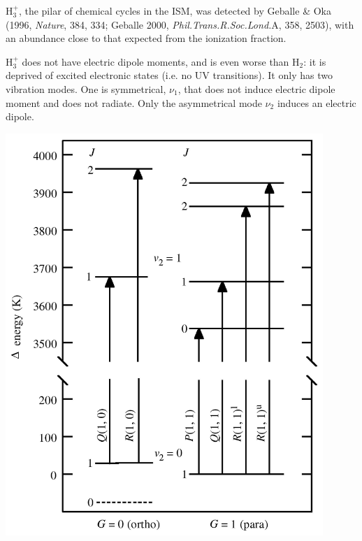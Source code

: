 
\begin{minipage}[t]{13cm}
H$_3^+$, the pilar of chemical cycles in the ISM, was detected by
Geballe \& Oka (1996, {\em Nature}, 384, 334; Geballe 2000, {\em
Phil.Trans.R.Soc.Lond.}A, 358, 2503), with an abundance close to that
expected from the ionization fraction.

H$_3^+$ does not have electric dipole moments, and is even worse than
H$_2$: it is deprived of excited electronic states (i.e. no UV
transitions). It only has two vibration modes. One is symmetrical,
$\nu_1$, that does not induce electric dipole moment and does not
radiate. Only the asymmetrical mode $\nu_2$ induces an electric dipole.

\end{minipage}
\hfill
\begin{minipage}[t]{12cm}
  \vspace{-1cm}
  \begin{center}
    \includegraphics[width=12cm,height=!]{./B/h3_levels.jpg}
  \end{center}
\end{minipage}



